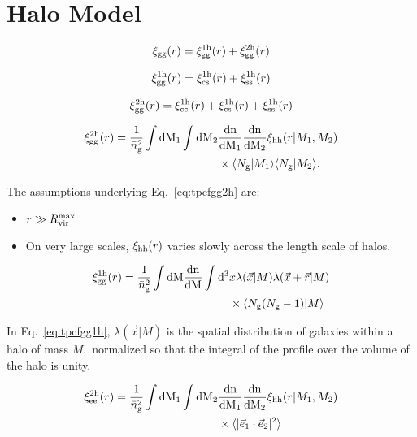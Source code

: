 \documentclass[fleqn,usenatbib]{mnras}
\newcommand{\beq}{\begin{eqnarray}}
\newcommand{\eeq}{\end{eqnarray}}
\newcommand{\bit}{\begin{itemize}}
\newcommand{\eit}{\end{itemize}}
\newcommand{\tpcf}[1]{\xi_{\rm #1}}
\newcommand{\tpcftwo}[2]{\xi_{\rm #1}^{\rm #2}}
\newcommand{\evec}[1]{\vec{e}_{\rm #1}}
\newcommand{\dd}{\rm d}
\newcommand{\mean}[1]{\langle #1 \rangle}
\newcommand{\meantwo}[2]{\langle #1 \vert #2 \rangle}
\begin{document}
\section{Halo Model}

\beq
\tpcf{gg}(r) = \tpcftwo{gg}{1h}(r) + \tpcftwo{gg}{2h}(r)
\eeq

\beq
\tpcftwo{gg}{1h}(r) = \tpcftwo{cs}{1h}(r) + \tpcftwo{ss}{1h}(r) 
\eeq

\beq
\tpcftwo{gg}{2h}(r) =  \tpcftwo{cc}{1h}(r) + \tpcftwo{cs}{1h}(r) + \tpcftwo{ss}{1h}(r) 
\eeq

\begin{align}
\label{eq:tpcfgg2h}
\begin{split}
\tpcftwo{gg}{2h}(r) =   \frac{1}{\bar{n}_{\rm g}^{2}}\int\dd M_1 \int\dd M_2 & \frac{\rm dn}{\dd M_1}\frac{\rm dn}{\dd M_2} \tpcf{hh}(r\vert M_1, M_2) \\& \times  \meantwo{N_{\rm g}}{M_1} \meantwo{N_{\rm g}}{M_2}. 
\end{split}
\end{align}

The assumptions underlying Eq.~\ref{eq:tpcfgg2h} are:
\bit
\item $r\gg R_{\rm vir}^{\rm max}$
\item On very large scales, $\tpcf{hh}(r)$ varies slowly across the length scale of halos. 
\eit

\begin{align}
\label{eq:tpcfgg1h}
\begin{split}
\tpcftwo{gg}{1h}(r) =  \frac{1}{\bar{n}_{\rm g}^{2}} \int\dd M \frac{\rm dn}{\dd M} \int\dd^{3}& x\lambda(\vec{x}\vert M)\lambda(\vec{x}+\vec{r}\vert M)\\ & \times  \meantwo{N_{\rm g}(N_{\rm g}-1)}{M}
\end{split}
\end{align}

In Eq.~\ref{eq:tpcfgg1h}, $\lambda(\vec{x}\vert M)$ is the spatial distribution of galaxies within a halo of mass $M,$ normalized so that the integral of the profile over the volume of the halo is unity.

\begin{align}
\label{eq:tpcfee2h}
\begin{split}
\tpcftwo{ee}{2h}(r) =   \frac{1}{\bar{n}_{\rm g}^{2}}\int\dd M_1 \int\dd M_2 & \frac{\rm dn}{\dd M_1}\frac{\rm dn}{\dd M_2} \tpcf{hh}(r\vert M_1, M_2) \\& \times  \mean{\vert\evec{1}\cdot\evec{2}\vert^{2}}
\end{split}
\end{align}
\end{document}
